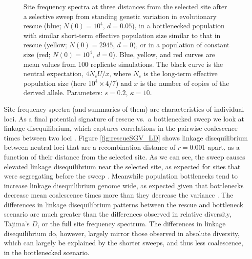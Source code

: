 \documentclass[]{article}
\begin{document}
\begin{figure}[htb]
\centering
{}
\caption{
Site frequency spectra at three distances from the selected site after a selective sweep from standing genetic variation in evolutionary rescue (blue; $N(0)=10^4$, $d=0.05$), in a bottlenecked population with similar short-term effective population size similar to that in rescue (yellow; $N(0)=2945$, $d=0$), or in a population of constant size (red; $N(0)=10^4$, $d=0$).
Blue, yellow, and red curves are mean values from 100 replicate simulations.
The black curve is the neutral expectation, $4 N_e U / x$, where $N_e$ is the long-term effective population size (here $10^4\times 4/7$) and $x$ is the number of copies of the derived allele.
Parameters: $s=0.2$, $\kappa=10$. 
}%
\label{fig:rescueSGV_SFS}
\end{figure}

Site frequency spectra (and summaries of them) are characteristics of individual loci.
As a final potential signature of rescue vs.\ a bottlenecked sweep we look at linkage disequilibrium, which captures correlations in the pairwise coalescence times between two loci \citep[][p.\ 236]{wakeley2009coalescent}.
Figure \ref{fig:rescueSGV_LD} shows linkage disequilibrium between neutral loci that are a recombination distance of $r=0.001$ apart, as a function of their distance from the selected site.
As we can see, the sweep causes elevated linkage disequilibrium near the selected site, as expected for sites that were segregating before the sweep \citep{kim2004linkage,mcvean2007structure}.
Meanwhile population bottlenecks tend to increase linkage disequilibrium genome wide, as expected given that bottlenecks decrease mean coalescence times more than they decrease the variance \citep{mcvean2002genealogical}.
The differences in linkage disequilibrium patterns between the rescue and bottleneck scenario are much greater than the differences observed in relative diversity, Tajima's $D$, or the full site frequency spectrum. 
The differences in linkage disequilibrium do, however, largely mirror those observed in absolute diversity, which can largely be explained by the shorter sweeps, and thus less coalescence, in the bottlenecked scenario.
\end{document}
